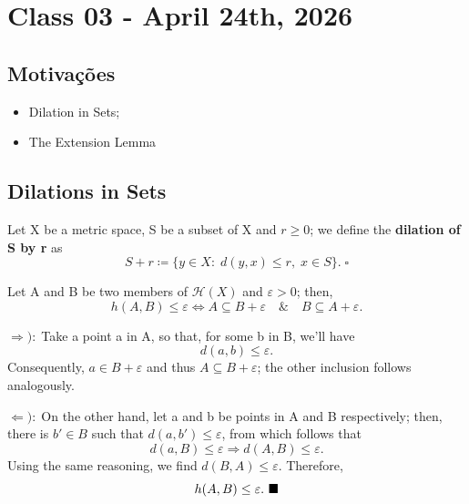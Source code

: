 \documentclass[../fractals_everywhere.tex]{subfiles}
\begin{document}
\section{Class 03 - April 24th, 2026}
\subsection{Motivações}
\begin{itemize}
	\item Dilation in Sets;
	\item The Extension Lemma
\end{itemize}
\subsection{Dilations in Sets}

\begin{def*}
	Let X be a metric space, S be a subset of X and \(r\geq 0\); we define the \textbf{dilation of S by r} as
	\[
		S + r \coloneqq \{y\in X:\; d(y, x) \leq r,\; x\in S\}.\; \square
	\]
\end{def*}
\begin{lemma*}
	Let A and B be two members of \(\mathcal{H}(X)\) and \(\varepsilon > 0\); then,
	\[
		h(A, B) \leq \varepsilon  \Longleftrightarrow A \subseteq B + \varepsilon  \quad\&\quad B \subseteq A + \varepsilon .
	\]
\end{lemma*}
\begin{proof*}
	\(\Rightarrow ):\; \)Take a point a in A, so that, for some b in B, we'll have
	\[
		d(a, b) \leq \varepsilon .
	\]
	Consequently, \(a\in B+\varepsilon \) and thus \(A\subseteq B+\varepsilon \); the other inclusion follows analogously.

	\(\Leftarrow ):\;\)On the other hand, let a and b be points in A and B respectively; then, there is \(b'\in B\) such that \(d(a, b')\leq \varepsilon \), from which follows that
	\[
		d(a, B)\leq \varepsilon  \Rightarrow d(A, B)\leq \varepsilon .
	\]
	Using the same reasoning, we find \(d(B, A)\leq \varepsilon \). Therefore,
	\[
		h(A, B)\leq \varepsilon .\text{ $\blacksquare$}
	\]
\end{proof*}
\end{document}

